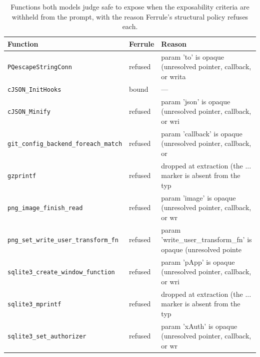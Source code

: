 \begin{table}[!t]
\caption{Functions both models judge safe to expose when the exposability
criteria are withheld from the prompt, with the reason Ferrule's structural
policy refuses each.}
\label{tab:llm-overlap}
\centering\footnotesize
\begin{tabular}{llp{3.4cm}}
\toprule
\textbf{Function} & \textbf{Ferrule} & \textbf{Reason} \\
\midrule
\texttt{PQescapeStringConn} & refused & param 'to' is opaque (unresolved pointer, callback, or writa \\
\texttt{cJSON\_InitHooks} & bound & --- \\
\texttt{cJSON\_Minify} & refused & param 'json' is opaque (unresolved pointer, callback, or wri \\
\texttt{git\_config\_backend\_foreach\_match} & refused & param 'callback' is opaque (unresolved pointer, callback, or \\
\texttt{gzprintf} & refused & dropped at extraction (the ... marker is absent from the typ \\
\texttt{png\_image\_finish\_read} & refused & param 'image' is opaque (unresolved pointer, callback, or wr \\
\texttt{png\_set\_write\_user\_transform\_fn} & refused & param 'write\_user\_transform\_fn' is opaque (unresolved pointe \\
\texttt{sqlite3\_create\_window\_function} & refused & param 'pApp' is opaque (unresolved pointer, callback, or wri \\
\texttt{sqlite3\_mprintf} & refused & dropped at extraction (the ... marker is absent from the typ \\
\texttt{sqlite3\_set\_authorizer} & refused & param 'xAuth' is opaque (unresolved pointer, callback, or wr \\
\bottomrule
\end{tabular}
\end{table}
